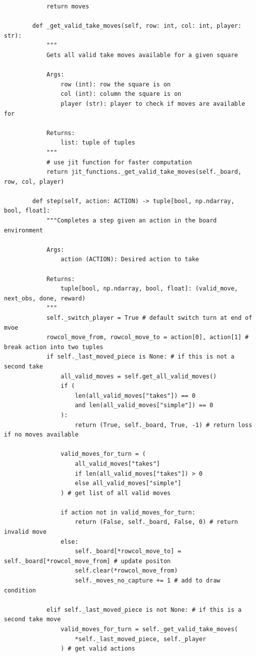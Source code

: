 \documentclass{article}
\begin{document}
\begin{verbatim}
            return moves

        def _get_valid_take_moves(self, row: int, col: int, player: str):
            """
            Gets all valid take moves available for a given square

            Args:
                row (int): row the square is on
                col (int): column the square is on
                player (str): player to check if moves are available for

            Returns:
                list: tuple of tuples
            """
            # use jit function for faster computation
            return jit_functions._get_valid_take_moves(self._board, row, col, player) 

        def step(self, action: ACTION) -> tuple[bool, np.ndarray, bool, float]:
            """Completes a step given an action in the board environment

            Args:
                action (ACTION): Desired action to take

            Returns:
                tuple[bool, np.ndarray, bool, float]: (valid_move, next_obs, done, reward)
            """
            self._switch_player = True # default switch turn at end of mvoe
            rowcol_move_from, rowcol_move_to = action[0], action[1] # break action into two tuples
            if self._last_moved_piece is None: # if this is not a second take
                all_valid_moves = self.get_all_valid_moves()
                if (
                    len(all_valid_moves["takes"]) == 0
                    and len(all_valid_moves["simple"]) == 0
                ):
                    return (True, self._board, True, -1) # return loss if no moves available

                valid_moves_for_turn = (
                    all_valid_moves["takes"]
                    if len(all_valid_moves["takes"]) > 0
                    else all_valid_moves["simple"]
                ) # get list of all valid moves

                if action not in valid_moves_for_turn:
                    return (False, self._board, False, 0) # return invalid move
                else:
                    self._board[*rowcol_move_to] = self._board[*rowcol_move_from] # update positon
                    self.clear(*rowcol_move_from) 
                    self._moves_no_capture += 1 # add to draw condition

            elif self._last_moved_piece is not None: # if this is a second take move
                valid_moves_for_turn = self._get_valid_take_moves(
                    *self._last_moved_piece, self._player
                ) # get valid actions


\end{verbatim}
\end{document}
